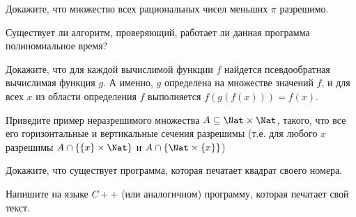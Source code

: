 \setcounter{curtask}{9}


\begin{task}
    Докажите, что множество всех рациональных чисел меньших $\pi$ разрешимо.
\end{task}

\begin{task}
    Существует ли алгоритм, проверяющий, работает ли данная программа
    полиномиальное время?
\end{task}

\begin{task}
    Докажите, что для каждой вычислимой функции $f$ найдется
    псевдообратная вычислимая функция $g$. А именно, $g$ определена на
    множестве значений $f$, и для всех $x$ из области определения $f$
    выполняется $f(g(f(x))) = f(x)$.
\end{task}

\begin{task}
    Приведите пример неразрешимого множества $A \subseteq \Nat \times \Nat$,
    такого, что все его горизонтальные и вертикальные сечения
    разрешимы (т.е. для любого $x$ разрешимы $A \cap \{\{x\} \times \Nat\}$
    и $A \cap \{\Nat \times \{x\}\}$)
\end{task}

\begin{task}
    Докажите, что существует программа, которая печатает квадрат
    своего номера.
\end{task}

\begin{task}
    Напишите на языке $C++$ (или аналогичном) программу, которая
    печатает свой текст.
\end{task}
